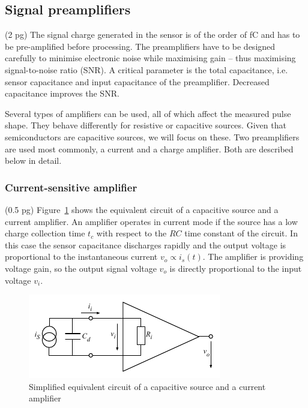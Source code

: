 \documentclass[11pt]{mytustyle}  %
\begin{document}
\subsection{Signal preamplifiers}
(2 pg)
The signal charge generated in the sensor is of the order of fC and has to be pre-amplified before processing. The preamplifiers have to be designed carefully to minimise electronic noise while maximising gain -- thus maximising signal-to-noise ratio (SNR). A critical parameter is the total capacitance, i.e. sensor capacitance and input capacitance of the preamplifier. Decreased capacitance improves the SNR. 

Several types of amplifiers can be used, all of which affect the measured pulse shape. They behave differently for resistive or capacitive sources. Given that semiconductors are capacitive sources, we will focus on these. Two preamplifiers are used most commonly, a current and a charge amplifier. Both are described below in detail. 


\subsubsection{Current-sensitive amplifier}
(0.5 pg)
Figure~\ref{fig:curramp} shows the equivalent circuit of a capacitive source and a current amplifier. An amplifier operates in current mode if the source has a low charge collection time $t_c$ with respect to the $RC$ time constant of the circuit. In this case the sensor capacitance discharges rapidly and the output voltage is proportional to the instantaneous current $v_o \propto i_s(t)$. The amplifier is providing voltage gain, so the output signal voltage $v_o$ is directly proportional to the input voltage $v_i$.

\begin{figure}[!t]
\begin{center}
\includegraphics[width=0.6\linewidth]{plots/curramp}
\caption{Simplified equivalent circuit of a capacitive source and a current amplifier}
\label{fig:curramp}
\end{center}
\end{figure}
\end{document}
